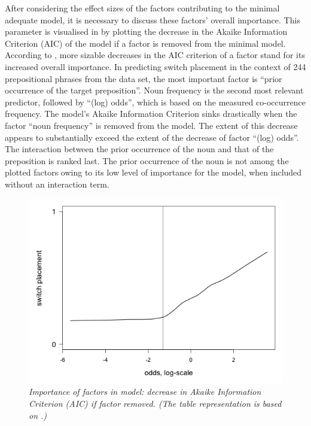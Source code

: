 After considering the effect sizes of the factors contributing to the minimal adequate model, it is necessary to discuss these factors’ overall importance. This parameter is visualised in  by plotting the decrease in the Akaike Information Criterion (AIC) of the model if a factor is removed from the minimal model. According to \cite{szmrecsanyi-2013}, more sizable decreases in the AIC criterion of a factor stand for its increased overall importance. In predicting switch placement in the context of 244 prepositional phrases from the data set, the most important factor is “prior occurrence of the target preposition”. Noun frequency is the second most relevant predictor, followed by “(log) odds”, which is based on the measured co-occurrence frequency. The model's Akaike Information Criterion sinks drastically when the factor “noun frequency” is removed from the model. The extent of this decrease appears to substantially exceed the extent of the decrease of factor “(log) odds”. The interaction between the prior occurrence of the noun and that of the preposition is ranked last. The prior occurrence of the noun is not among the plotted factors owing to its low level of importance for the model, when included without an interaction term.

\begin{figure}
    \centering
	\includegraphics[scale=0.5]{figures/5-Figure_2.png}	
	\caption{\textit{Importance of factors in model: decrease in Akaike Information Criterion (AIC) if factor removed. (The table representation is based on \citealt{szmrecsanyi-2013}.)}}\label{fig:5:5}
\end{figure}

